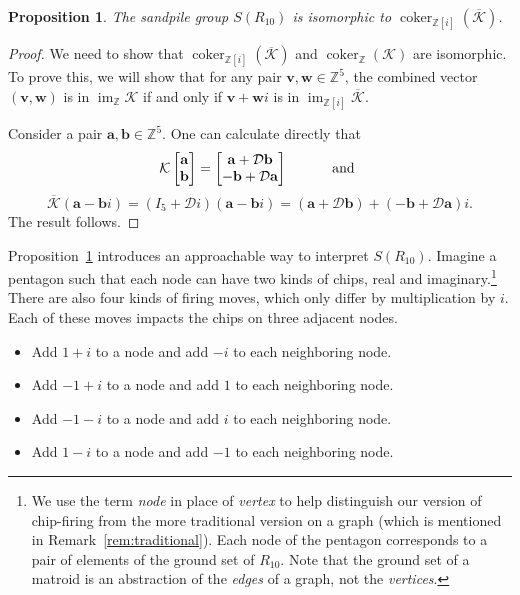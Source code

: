 \documentclass[12p]{amsart}
\numberwithin{equation}{section}
\theoremstyle{plain}
\newtheorem{prop}[thm]{Proposition}
\theoremstyle{definition}
\newcommand{\Z}{\mathbb {Z}}
\newcommand{\mbf}{\mathbf}
\DeclareMathOperator{\im}{im}
\DeclareMathOperator{\coker}{coker}
\begin{document}
\begin{prop}\label{prop:samecoker}
    The sandpile group $S(R_{10})$ is isomorphic to $\coker_{\Z[i]} (\overline{\mathcal K})$. 
\end{prop}
\begin{proof}
    We need to show that $\coker_{\Z[i]} (\overline{\mathcal K})$ and $\coker_{\Z} ({\mathcal K})$ are isomorphic. To prove this, we will show that for any pair $\mbf v,\mbf w \in \Z^5$, the combined vector $(\mbf v,\mbf w)$ is in $\im_{\Z} \mathcal K$ if and only if $\mbf v + \mbf w i$ is in $\im_{\Z[i]} \overline{\mathcal K}$. 

    Consider a pair $\mbf a,\mbf b \in \Z^5$. One can calculate directly that
    \[\mathcal K \begin{bmatrix}\mbf a \\ \mbf b \end{bmatrix} = \begin{bmatrix}\mbf a + \mathcal D\mbf b \\  -\mbf b + \mathcal D\mbf a\end{bmatrix} \hspace{ 1 cm}\text{ and }\]
    \[\overline{\mathcal K} (\mbf a - \mbf b i) = (I_5 + \mathcal D i) (\mbf a - \mbf b i) = (\mbf a + \mathcal D\mbf b) +  (-\mbf b + \mathcal D\mbf a)i.\]
    The result follows. 
\end{proof}

Proposition~\ref{prop:samecoker} introduces an approachable way to interpret $S(R_{10})$. Imagine a pentagon such that each node can have two kinds of chips, real and imaginary.\footnote{We use the term \emph{node} in place of \emph{vertex} to help distinguish our version of chip-firing from the more traditional version on a graph (which is mentioned in Remark~\ref{rem:traditional}). Each node of the pentagon corresponds to a pair of elements of the ground set of $R_{10}$. Note that the ground set of a matroid is an abstraction of the \emph{edges} of a graph, not the \emph{vertices}.} There are also four kinds of firing moves, which only differ by multiplication by $i$. Each of these moves impacts the chips on three adjacent nodes. 


\begin{itemize}
    \item[(A)~] Add $1+i$ to a node and add $-i$ to each neighboring node. 
    \item[(B)~] Add $-1+i$ to a node and add $1$ to each neighboring node. 
    \item[(-A)] Add $-1-i$ to a node and add $i$ to each neighboring node. 
    \item[(-B)] Add $1-i$ to a node and add $-1$ to each neighboring node. 
\end{itemize}
\end{document}
